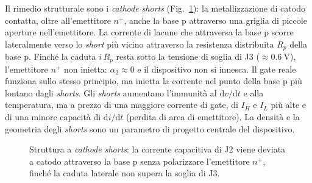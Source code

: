 \documentclass[11pt,a4paper]{article}
\newcommand{\IH}{\ensuremath{I_H}}
\newcommand{\IL}{\ensuremath{I_L}}
\newcommand{\dvdt}{\ensuremath{\mathrm{d}v/\mathrm{d}t}}
\newcommand{\didt}{\ensuremath{\mathrm{d}i/\mathrm{d}t}}
\newcommand{\en}[1]{\emph{#1}}   %
\begin{document}
Il rimedio strutturale sono i \en{cathode shorts} (Fig.~\ref{fig:shorts}): la metallizzazione di catodo contatta, oltre all'emettitore $n^+$, anche la base p attraverso una griglia di piccole aperture nell'emettitore. La corrente di lacune che attraversa la base p scorre lateralmente verso lo \en{short} più vicino attraverso la resistenza distribuita $R_p$ della base p. Finché la caduta $i\,R_p$ resta sotto la tensione di soglia di J3 ($\approx\qty{0.6}{\V}$), l'emettitore $n^+$ non inietta: $\alpha_2\approx0$ e il dispositivo non si innesca. Il gate reale funziona sullo stesso principio, ma inietta la corrente nel punto della base p più lontano dagli \en{shorts}. Gli \en{shorts} aumentano l'immunità al $\dvdt$ e alla temperatura, ma a prezzo di una maggiore corrente di gate, di $\IH$ e $\IL$ più alte e di una minore capacità di $\didt$ (perdita di area di emettitore). La densità e la geometria degli \en{shorts} sono un parametro di progetto centrale del dispositivo.

\begin{figure}[htbp]
\centering
{}
\caption{Struttura a \en{cathode shorts}: la corrente capacitiva di J2 viene deviata a catodo attraverso la base p senza polarizzare l'emettitore $n^+$, finché la caduta laterale non supera la soglia di J3.}
\label{fig:shorts}
\end{figure}
\end{document}
